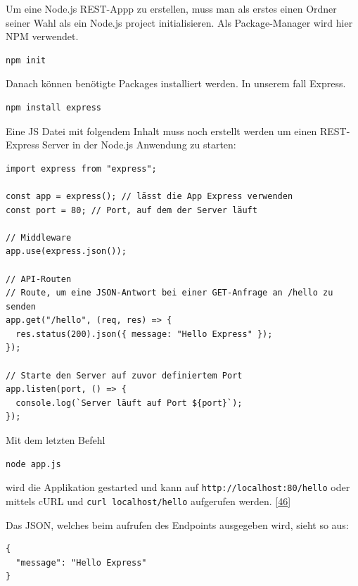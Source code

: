 \documentclass[
    headings=optiontotocandhead,%
    twoside,
    numbers=noenddot,%
    12pt, %
    titlepage, %
    parskip=full, %
    listof=leveldown, 
    numbers=noenddot, %
    a4paper,DIV=14,
    BCOR=15mm,
]{scrbook}
\newcommand{\passthrough}[1]{#1}
\begin{document}
Um eine Node.js REST-Appp zu erstellen, muss man als erstes einen Ordner
seiner Wahl als ein Node.js project initialisieren. Als Package-Manager
wird hier NPM verwendet.

\begin{lstlisting}[caption={Initialisieren eines Node.js Projekts}]
  npm init
\end{lstlisting}

Danach können benötigte Packages installiert werden. In unserem fall
Express.

\begin{lstlisting}[caption={Installieren vom Express package}]
npm install express
\end{lstlisting}

Eine JS Datei mit folgendem Inhalt muss noch erstellt werden um einen
REST-Express Server in der Node.js Anwendung zu starten:

\begin{lstlisting}[caption={Beispiel für eine REST Schnitstelle in Node.js}]
import express from "express";

const app = express(); // lässt die App Express verwenden
const port = 80; // Port, auf dem der Server läuft

// Middleware
app.use(express.json());

// API-Routen
// Route, um eine JSON-Antwort bei einer GET-Anfrage an /hello zu senden
app.get("/hello", (req, res) => {
  res.status(200).json({ message: "Hello Express" });
});

// Starte den Server auf zuvor definiertem Port
app.listen(port, () => {
  console.log(`Server läuft auf Port ${port}`);
});
\end{lstlisting}

Mit dem letzten Befehl

\begin{lstlisting}[caption={Starten einer Node.js Applikation}]
node app.js
\end{lstlisting}

wird die Applikation gestarted und kann auf
\passthrough{\lstinline!http://localhost:80/hello!} oder mittels cURL
und \passthrough{\lstinline!curl localhost/hello!} aufgerufen werden.
{[}\protect\hyperlink{ref-medium-rest-api}{46}{]}

Das JSON, welches beim aufrufen des Endpoints ausgegeben wird, sieht so
aus:

\begin{lstlisting}[caption={Ausgabe eines Beispiel-REST-Endpoints}]
{
  "message": "Hello Express"
}
\end{lstlisting}
\end{document}
